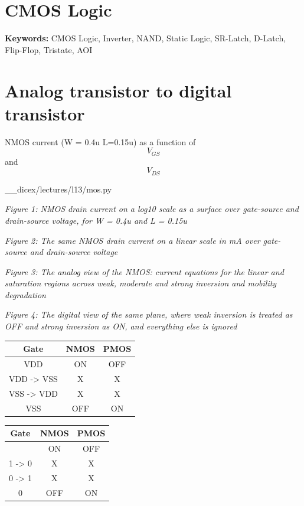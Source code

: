 \section{CMOS Logic}\label{cmos-logic}

\textbf{Keywords:} CMOS Logic, Inverter, NAND, Static Logic, SR-Latch,
D-Latch, Flip-Flop, Tristate, AOI

\section{Analog transistor to digital
transistor}\label{analog-transistor-to-digital-transistor}

NMOS current (W = 0.4u L=0.15u) as a function of \[V_{GS}\] and
\[V_{DS}\]

\_\_dicex/lectures/l13/mos.py


{
\centering
{}
}

\emph{Figure 1: NMOS drain current on a log10 scale as a surface over
gate-source and drain-source voltage, for W = 0.4u and L = 0.15u}


{
\centering
{}
}

\emph{Figure 2: The same NMOS drain current on a linear scale in mA over
gate-source and drain-source voltage}


{
\centering
{}
}

\emph{Figure 3: The analog view of the NMOS: current equations for the
linear and saturation regions across weak, moderate and strong inversion
and mobility degradation}


{
\centering
{}
}

\emph{Figure 4: The digital view of the same plane, where weak inversion
is treated as OFF and strong inversion as ON, and everything else is
ignored}

\begin{longtable}[]{@{}ccc@{}}
\toprule\noalign{}
Gate & NMOS & PMOS \\
\midrule\noalign{}
\endhead
\bottomrule\noalign{}
\endlastfoot
VDD & ON & OFF \\
VDD -\textgreater{} VSS & X & X \\
VSS -\textgreater{} VDD & X & X \\
VSS & OFF & ON \\
\end{longtable}

\begin{longtable}[]{@{}ccc@{}}
\toprule\noalign{}
Gate & NMOS & PMOS \\
\midrule\noalign{}
\endhead
\bottomrule\noalign{}
\endlastfoot
1 & ON & OFF \\
1 -\textgreater{} 0 & X & X \\
0 -\textgreater{} 1 & X & X \\
0 & OFF & ON \\
\end{longtable}

